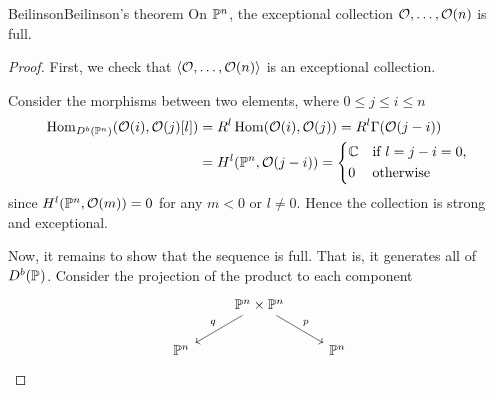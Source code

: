 
\begin{theorem}{Beilinson}{Beilinson's theorem}
    On $\P^n$, the exceptional collection $\O,\dots,\O(n)$ is full.
\end{theorem}

\begin{proof}
    First, we check that $\langle\O,\dots,\O(n)\rangle$ is an exceptional collection.

    Consider the morphisms between two elements, where $0\leq j\leq i \leq n$
    \begin{align*}
        \Hom_{D^b(\P^n)}(\O(i),\O(j)[l])
            &= R^l\Hom(\O(i),\O(j))
            = R^l\Gamma(\O(j-i)) \\
            &= H^l(\P^n,\O(j-i))
            = \begin{cases*}
                \C & if $l=j-i=0$, \\
                0 & otherwise
            \end{cases*}
    \end{align*}
    since $H^{l}(\P^n,\O(m))=0$ for any $m<0$ or $l \neq 0$. Hence the collection is strong and exceptional.

    Now, it remains to show that the sequence is full. That is, it generates all of $D^b(\P^{})$. Consider the projection of the product to each component
    \begin{equation*}
        \begin{tikzcd}
            & \P^n\times\P^n \ar[dl,"q"'] \ar[dr,"p"] \\
            \P^n & & \P^n
        \end{tikzcd}
    \end{equation*}



\end{proof}
